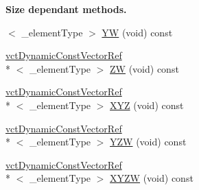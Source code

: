 \begin{Indent}{\bf Size dependant methods.}
\begin{DoxyCompactItemize}
$<$ \-\_\-element\-Type $>$ \hyperlink{classvct_dynamic_const_vector_base_ab37fb7ec7ac657f4d07229cf7e0390cf}{Y\-W} (void) const 
\item 
\hyperlink{classvct_dynamic_const_vector_ref}{vct\-Dynamic\-Const\-Vector\-Ref}\\*
$<$ \-\_\-element\-Type $>$ \hyperlink{classvct_dynamic_const_vector_base_abb52e08becc1faf8a447a89e8b19996b}{Z\-W} (void) const 
\item 
\hyperlink{classvct_dynamic_const_vector_ref}{vct\-Dynamic\-Const\-Vector\-Ref}\\*
$<$ \-\_\-element\-Type $>$ \hyperlink{classvct_dynamic_const_vector_base_a736496b00730902ffac7167f6ded6c59}{X\-Y\-Z} (void) const 
\item 
\hyperlink{classvct_dynamic_const_vector_ref}{vct\-Dynamic\-Const\-Vector\-Ref}\\*
$<$ \-\_\-element\-Type $>$ \hyperlink{classvct_dynamic_const_vector_base_a1d0f6385af081da4af06bac3facd3063}{Y\-Z\-W} (void) const 
\item 
\hyperlink{classvct_dynamic_const_vector_ref}{vct\-Dynamic\-Const\-Vector\-Ref}\\*
$<$ \-\_\-element\-Type $>$ \hyperlink{classvct_dynamic_const_vector_base_ade777ffc32d638b381fd953c0b76fac9}{X\-Y\-Z\-W} (void) const 
\end{DoxyCompactItemize}
\end{Indent}
